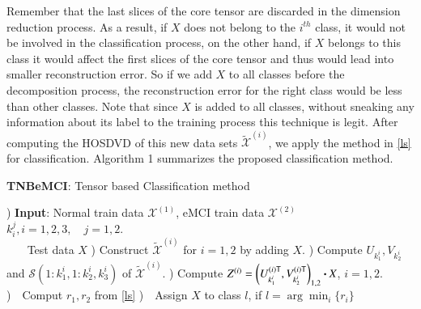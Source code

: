 \documentclass[preprint,12pt]{elsarticle}
\begin{document}
Remember that the last slices of the core tensor are discarded in the dimension reduction process. As a result, if $X$ does not belong to the $i^{th}$ class, it would not be involved in the classification process, on the other hand, if $X$ belongs to this class it would affect the first slices of the core tensor and thus would lead into smaller reconstruction error. So if we add $X$ to all classes before the decomposition process, the reconstruction error for the right class would be less than other classes. Note that since $X$ is added to all classes, without sneaking any information about its label to the training process this technique is legit.      
 After computing the HOSDVD of this new data sets $\widetilde{\mathcal{X}}^{(i)}$, we apply the method in \eqref{ls} for classification.  Algorithm 1 summarizes the proposed classification method.
\begin{algorithm}[h!]
	\label{ATNB}
	\caption{\textbf{TNBeMCI}: Tensor based Classification method}
	\begin{algorithmic}
		) \textbf{Input}: Normal train data $\mathcal{X}^{(1)}$, eMCI train data $\mathcal{X}^{(2)}$
		\STATE~~~    $k_i^j, i=1,2,3, \quad j=1,2$.\\
		\STATE~~~ Test data $X$
		) Construct $\widetilde{\mathcal{X}}^{(i)}$ for $i=1,2$ by adding $X$.
		) Compute $U_{k_1^i}, V_{k_2^i}$ and $\mathcal{S}(1:k_1^i,1:k_2^i,k_3^i)$ of  $\widetilde{\mathcal{X}}^{(i)}$.
		) Compute $Z^{(i)} = \left( U_{k_1^i}^{(i)\sf T}, V_{k_2^i}^{(i)\sf T} 
		\right)_{1,2}\boldsymbol{\cdot} X$, $i=1,2.$
		)~~Comput $r_1,r_2$ from \eqref{ls}
		 )~~Assign $X$ to class $l$, if $l= \arg \min_{i} \{r_i\}$
	\end{algorithmic}
\end{algorithm}
\end{document}
